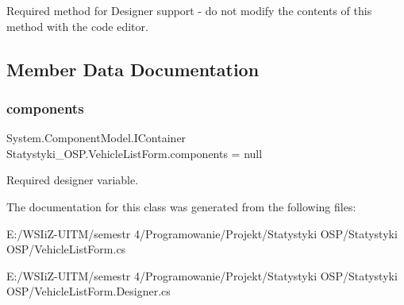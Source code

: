 Required method for Designer support -\/ do not modify the contents of this method with the code editor. 



\subsection{Member Data Documentation}
\mbox{\label{class_statystyki___o_s_p_1_1_vehicle_list_form_a9b4f34a0698ca5a4cb348f402d7d9708}} 
\subsubsection{\texorpdfstring{components}{components}}
{\footnotesize\ttfamily System.\+Component\+Model.\+I\+Container Statystyki\+\_\+\+O\+S\+P.\+Vehicle\+List\+Form.\+components = null\hspace{0.3cm}{\ttfamily [private]}}



Required designer variable. 



The documentation for this class was generated from the following files\+:\begin{DoxyCompactItemize}
\item 
E\+:/\+W\+S\+Ii\+Z-\/\+U\+I\+T\+M/semestr 4/\+Programowanie/\+Projekt/\+Statystyki O\+S\+P/\+Statystyki O\+S\+P/Vehicle\+List\+Form.\+cs\item 
E\+:/\+W\+S\+Ii\+Z-\/\+U\+I\+T\+M/semestr 4/\+Programowanie/\+Projekt/\+Statystyki O\+S\+P/\+Statystyki O\+S\+P/Vehicle\+List\+Form.\+Designer.\+cs\end{DoxyCompactItemize}
